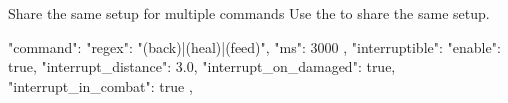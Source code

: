 \begin{example}{Share the same setup for multiple commands}
    Use the  to share the same setup.
    \begin{json}
    {
        "command": {
        "regex": "(back)|(heal)|(feed)",
        "ms": 3000
    },
        "interruptible": {
        "enable": true,
        "interrupt_distance": 3.0,
        "interrupt_on_damaged": true,
        "interrupt_in_combat": true
    }
    }
        ,
    \end{json}
\end{example}
